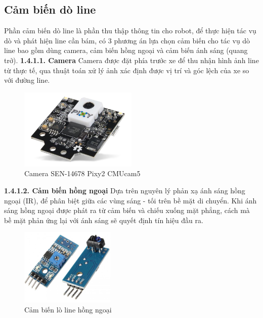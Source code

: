     \subsection{Cảm biến dò line}
    \hspace*{0.6cm} Phần cảm biến dò line là phần thu thập thông tin cho robot, để thực hiện tác vụ dò và
    phát hiện line cần bám, có 3 phương án lựa chọn cảm biến cho tác vụ dò line bao gồm dùng camera, cảm
    biến hồng ngoại và cảm biến ánh sáng (quang trở).
    \newline
    \textbf{1.4.1.1. Camera}
    \newline
    \hspace*{0.6cm} Camera được đặt phía trước xe để thu nhận hình ảnh line từ thực tế, qua thuật toán
xử lý ảnh xác định được vị trí và góc lệch của xe so với đường line.
    \begin{figure}[H]
        \centering
        \includegraphics[width=0.5\textwidth]{pictures/chapter1/chapter1_pic15_camera.png}
        \caption{Camera SEN-14678 Pixy2 CMUcam5}
        \label{chap1_pic15}
    \end{figure}
    \textbf{1.4.1.2. Cảm biến hồng ngoại}
    \newline
    \hspace*{0.6cm} Dựa trên nguyên lý phản xạ ánh sáng hồng ngoại (IR), để phân biệt giữa các vùng sáng - tối
    trên bề mặt di chuyển. Khi ánh sáng hồng ngoại được phát ra từ cảm biến và chiếu xuống mặt phẳng, cách mà bề mặt phản ứng lại với ánh sáng sẽ quyết định tín hiệu đầu ra.
    \begin{figure}[H]
        \centering
        \includegraphics[width=0.4\textwidth]{pictures/chapter1/chapter1_pic17_IR.png}
        \caption{Cảm biến lò line hồng ngoại}
        \label{chap1_pic17}
    \end{figure}
